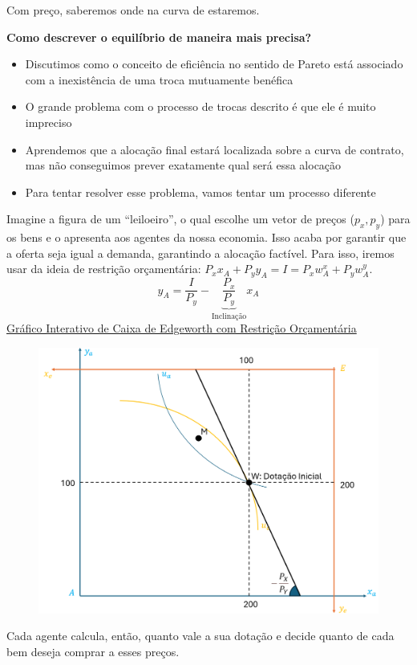 \documentclass[a4paper,12pt]{article}[abntex2]
\begin{document}
Com preço, saberemos onde na curva de estaremos. 

\textbf{Como descrever o equilíbrio de maneira mais precisa?}\begin{itemize}
   \item  Discutimos como o conceito de eficiência no sentido de Pareto está associado com a inexistência de uma troca mutuamente benéfica
   \item  O grande problema com o processo de trocas descrito é que ele é muito impreciso
   \item  Aprendemos que a alocação final estará localizada sobre a curva de contrato, mas não conseguimos prever exatamente qual será essa alocação
   \item  Para tentar resolver esse problema, vamos tentar um processo diferente
\end{itemize}

Imagine a figura de um “leiloeiro”, o qual escolhe um vetor de preços ($p_x,p_y$)  para os bens e o apresenta aos agentes da nossa economia. Isso acaba por garantir que a oferta seja igual a demanda, garantindo a alocação factível. Para isso, iremos usar da ideia de restrição orçamentária: $P_xx_A+P_yy_A=I=P_xw_A^x+P_yw_A^y$.
\[
y_A=\frac{I}{P_y}-\underbrace{\frac{P_x}{P_y}}_{\text{Inclinação}}x_A
\]
\href{https://www.econgraphs.org/graphs/exchange/edgeworth_box/trading_at_price_ratio}{Gráfico Interativo de Caixa de Edgeworth com Restrição Orçamentária}

\begin{figure}[H]
    \centering
    \includegraphics[width=0.70\linewidth]{Imagens/a3i8.png}
\end{figure}

Cada agente calcula, então, quanto vale a sua dotação e decide quanto de cada bem deseja comprar a esses preços.
\end{document}
